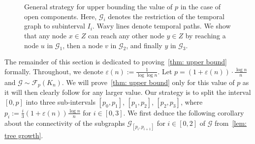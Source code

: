 \documentclass[a4paper,11pt]{article}
\theoremstyle{definition}
\theoremstyle{plain}
\let\eps\varepsilon
\newcommand{\FFF}{\mathcal{F}}
\newcommand{\GGG}{\mathcal{G}}
\newcommand{\G}{\mathcal G}
\begin{document}
\begin{figure}[ht]
{
  }
  \caption{General strategy for upper bounding the value of $p$ in the case of open components.
    Here, $\G_{i}$ denotes the restriction of the temporal
    graph to subinterval $I_{i}$.
    Wavy lines denote temporal paths. We
    show that any node $x\in Z$ can reach any other node
    $y\in Z$ by reaching a node $u$ in $\G_{1}$, then a node $v$ in $\G_{2}$, and
    finally $y$ in $\G_{3}$. }
  \label{fig:proof_scheme}
\end{figure}



The remainder of this section is dedicated to proving~\cref{thm: upper bound} formally.
%
Throughout, we denote $\eps(n):=\frac{1}{\log\log n}$.
Let $p=(1+\eps(n))\cdot \frac{\log n}{n}$ and $\GGG \sim \FFF_{p}(K_n)$.
We will prove~\cref{thm: upper bound} only for this value of $p$ as
it will then clearly follow for any larger value.
Our strategy is to split the interval $[0, p]$ into three sub-intervals $[p_0,p_1]$, $[p_1,p_2]$, $[p_2,p_3]$, where $p_i:=\frac{i}{3}(1+\eps(n))\frac{\log n}{n}$ for $i\in[0, 3]$.
We first deduce the following corollary about the connectivity of the subgraphs $\GGG_{[p_i, p_{i+1}]}$ for $i\in [0, 2]$ of $\GGG$ from~\cref{lem: tree growth}.
\end{document}
